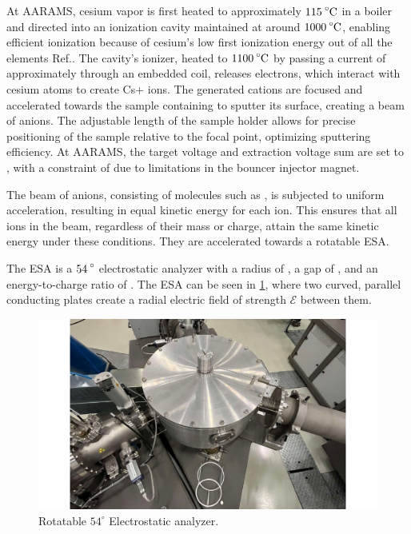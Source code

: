 At AARAMS, cesium vapor is first heated to approximately $\ce{115^{\circ}C}$ in a boiler and directed into an ionization cavity maintained at around $\ce{1000^{\circ}C}$, enabling efficient ionization because of cesium’s low first ionization energy out of all the elements Ref.\cite{mcmurry2018}. The cavity’s ionizer, heated to $\ce{1100^{\circ}C}$ by passing a current of approximately  through an embedded coil, releases electrons, which interact with cesium atoms to create Cs+ ions. The generated cations are focused and accelerated towards the sample containing  to sputter its surface, creating a beam of anions. The adjustable length of the sample holder allows for precise positioning of the sample relative to the focal point, optimizing sputtering efficiency. At AARAMS, the target voltage and extraction voltage sum are set to , with a constraint of  due to limitations in the bouncer injector magnet.

The beam of anions, consisting of molecules such as , is subjected to uniform acceleration, resulting in equal kinetic energy for each ion. This ensures that all ions in the beam, regardless of their mass or charge, attain the same kinetic energy under these conditions. They are accelerated towards a rotatable ESA.

The ESA is a $\ce{54^{\circ}}$ electrostatic analyzer with a radius of \ce{469 mm}, a gap of \ce{53 mm}, and an energy-to-charge ratio of  \cite{HVEE2013}. The ESA can be seen in \cref{fig:ESA54}, where two curved, parallel conducting plates create a radial electric field of strength $\mathcal{E}$ between them. 

\begin{figure}[ht]
    \centering
    \includegraphics[width=1\linewidth]{B/ESA1.pdf}
    \caption{Rotatable $54^{\circ}$ Electrostatic analyzer.}
    \label{fig:ESA54}
\end{figure}



